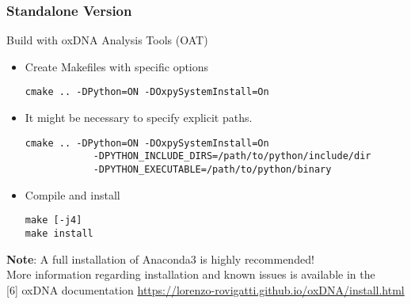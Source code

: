 \documentclass[slidestop,compress,9pt]{beamer}
\begin{document}
\begin{frame}[fragile]
\frametitle{Standalone Version}

Build with oxDNA Analysis Tools (OAT)\\[7pt]

\begin{itemize}
\item Create Makefiles with specific options
\begin{lstlisting}
cmake .. -DPython=ON -DOxpySystemInstall=On
\end{lstlisting}
\item It might be necessary to specify explicit paths.
\begin{lstlisting}
cmake .. -DPython=ON -DOxpySystemInstall=On 
            -DPYTHON_INCLUDE_DIRS=/path/to/python/include/dir
            -DPYTHON_EXECUTABLE=/path/to/python/binary
\end{lstlisting}
\item Compile and install
\begin{lstlisting}
make [-j4]
make install
\end{lstlisting}
\end{itemize}

\textbf{Note}: A full installation of Anaconda3 is highly recommended!\\[7pt]

More information regarding installation and known issues is available in the\\[3pt] 
[6] oxDNA documentation \href{https://lorenzo-rovigatti.github.io/oxDNA/install.html}{https://lorenzo-rovigatti.github.io/oxDNA/install.html}

\end{frame}
\end{document}
